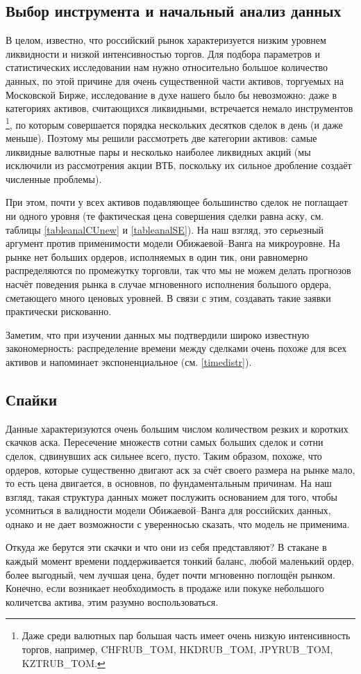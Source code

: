 \subsection{Выбор инструмента и начальный анализ данных} \label{InitAnal}
В целом, известно, что российский рынок характеризуется низким уровнем ликвидности и низкой интенсивностью торгов. 
Для подбора параметров и статистических исследовании
нам нужно относительно большое количество данных, по этой причине
для очень существенной части активов, торгуемых на Московской Бирже, 
исследование в духе нашего было бы невозможно: даже в категориях 
активов, считающихся ликвидными,
встречается немало инструментов \footnote{Даже среди валютных пар большая 
часть имеет очень низкую интенсивность торгов, например, CHFRUB\_TOM, HKDRUB\_TOM, 
JPYRUB\_TOM, KZTRUB\_TOM.}, по которым совершается порядка нескольких десятков сделок в день (и даже меньше). 
Поэтому мы решили рассмотреть две категории активов: самые ликвидные валютные пары
и несколько наиболее ликвидных акций (мы исключили из рассмотрения акции ВТБ, поскольку их сильное дробление создаёт 
численные проблемы).
\par
При этом, почти у всех активов подавляющее большинство сделок не поглащает ни одного уровня 
(те фактическая цена совершения сделки равна аску, см. таблицы \ref{tableanalCUnew} и \ref{tableanalSE}).
На наш взгляд, это серьезный аргумент против применимости модели Обижаевой--Ванга на микроуровне. На рынке нет
больших ордеров, исполняемых в один тик, они равномерно распределяются по промежутку торговли, так что мы не можем
делать прогнозов насчёт поведения рынка в случае мгновенного исполнения большого ордера, сметающего много ценовых
уровней. В связи с этим, создавать такие заявки практически рискованно.
\par
Заметим, что при изучении данных мы подтвердили широко известную закономерность: 
распределение времени между сделками очень похоже для всех активов и напоминает экспоненциальное 
(см. \ref{timedistr}).


\subsection{Спайки}

Данные характеризуются очень большим числом количеством резких и коротких скачков аска. 
Пересечение множеств
сотни самых больших сделок и сотни сделок, сдвинувших аск сильнее всего, пусто. Таким образом, похоже, что ордеров,
которые существенно двигают аск за счёт своего размера на рынке мало, то есть цена двигается, в основнов, по фундаментальным причинам.
На наш взгляд, такая структура данных может послужить основанием для того, чтобы усомниться в валидности модели Обижаевой--Ванга 
для российских данных, однако и не дает возможности с уверенносью сказать, что модель не применима. 
\par
Откуда же берутся эти скачки и что они из себя представляют? В стакане в каждый момент времени поддерживается тонкий баланс, любой
маленький ордер, более выгодный, чем лучшая цена, будет почти мгновенно поглощён рынком. Конечно, если возникает необходимость в продаже
или покуке небольшого количетсва актива, этим разумно воспользоваться.

